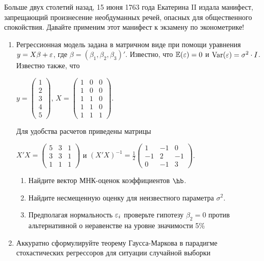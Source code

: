 \documentclass[12pt, a4paper]{article}
\theoremstyle{definition}
\begin{document}
Больше двух столетий назад, 15 июня 1763 года Екатерина II издала манифест, запрещающий произнесение необдуманных речей, опасных для общественного спокойствия. Давайте применим этот манифест к экзамену по эконометрике!



\begin{enumerate}
\item Регрессионная модель  задана в матричном виде при помощи уравнения $y=X\beta+\varepsilon$, где $\beta=(\beta_1,\beta_2,\beta_3)'$.
Известно, что $\mathbb{E}(\varepsilon)=0$  и  $\operatorname{Var}(\varepsilon)=\sigma^2\cdot I$.
Известно также, что

$y=\left(
\begin{array}{c}
1\\
2\\
3\\
4\\
5
\end{array}\right)$,
$X=\left(\begin{array}{ccc}
1 & 0 & 0 \\
1 & 0 & 0 \\
1 & 1 & 0 \\
1 & 1 & 0 \\
1 & 1 & 1
\end{array}\right)$.


Для удобства расчетов приведены матрицы


$X'X=\left(
\begin{array}{ccc}
5 & 3 & 1\\
3 & 3 & 1\\
1 & 1 & 1
\end{array}\right)$ и $(X'X)^{-1}=\frac{1}{2}\left(
\begin{array}{ccc}
1 & -1 & 0 \\
-1 & 2 & -1 \\
0 & -1 & 3
\end{array}\right)$.

\begin{enumerate}
\item Найдите вектор МНК-оценок коэффициентов $\hb$.
\item Найдите несмещенную оценку для неизвестного параметра $\sigma^2$.
\item Предполагая нормальность $\varepsilon_i$ проверьте гипотезу $\beta_2=0$ против альтернативной о неравенстве на уровне значимости 5\%

\end{enumerate}

\item Аккуратно сформулируйте теорему Гаусса-Маркова в парадигме стохастических регрессоров для ситуации случайной выборки


\end{enumerate}
\end{document}
